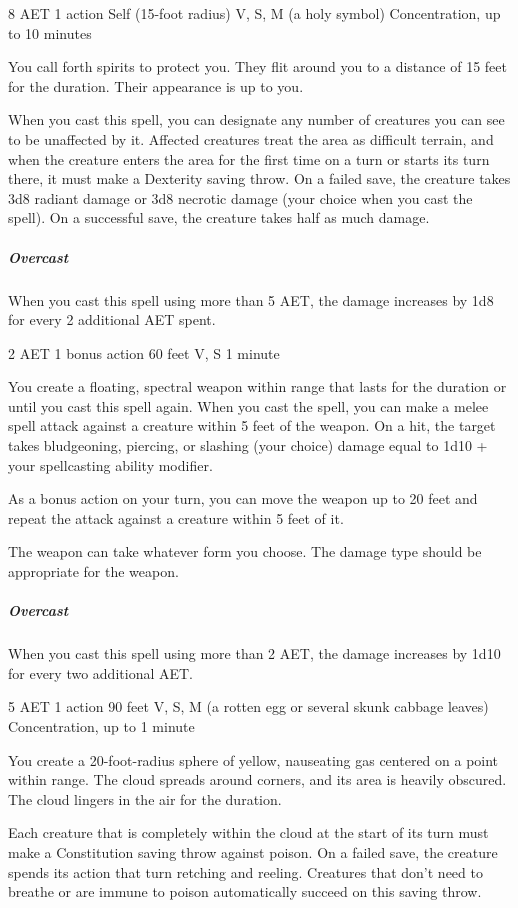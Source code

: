 {8 AET}
{1 action}
{Self (15-foot radius)}
{V, S, M (a holy symbol)}
{Concentration, up to 10 minutes}

You call forth spirits to protect you. They flit around you to a distance of 15 feet for the duration. Their appearance is up to you.

When you cast this spell, you can designate any number of creatures you can see to be unaffected by it. Affected creatures treat the area as difficult terrain, and when the creature enters the area for the first time on a turn or starts its turn there, it must make a Dexterity saving throw. On a failed save, the creature takes 3d8 radiant damage or 3d8 necrotic damage (your choice when you cast the spell). On a successful save, the creature takes half as much damage.

\subparagraph*{Overcast} When you cast this spell using more than 5 AET, the damage increases by 1d8 for every 2 additional AET spent.


{2 AET}
{1 bonus action}
{60 feet}
{V, S}
{1 minute}

You create a floating, spectral weapon within range that lasts for the duration or until you cast this spell again. When you cast the spell, you can make a melee spell attack against a creature within 5 feet of the weapon. On a hit, the target takes bludgeoning, piercing, or slashing (your choice) damage equal to 1d10 + your spellcasting ability modifier.

As a bonus action on your turn, you can move the weapon up to 20 feet and repeat the attack against a creature within 5 feet of it.

The weapon can take whatever form you choose. The damage type should be appropriate for the weapon.

\subparagraph*{Overcast} When you cast this spell using more than 2 AET, the damage increases by 1d10 for every two additional AET.


{5 AET}
{1 action}
{90 feet}
{V, S, M (a rotten egg or several skunk cabbage leaves)}
{Concentration, up to 1 minute}

You create a 20-foot-radius sphere of yellow, nauseating gas centered on a point within range. The cloud spreads around corners, and its area is heavily obscured. The cloud lingers in the air for the duration.

Each creature that is completely within the cloud at the start of its turn must make a Constitution saving throw against poison. On a failed save, the creature spends its action that turn retching and reeling. Creatures that don't need to breathe or are immune to poison automatically succeed on this saving throw.

